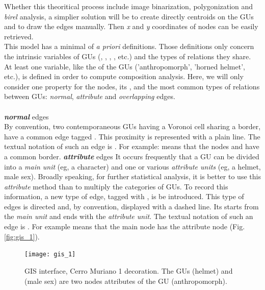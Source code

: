 \documentclass[article]{jss}\usepackage{knitr}
\begin{document}
Whether this theoritical process include image binarization, polygonization and \emph{birel} analysis, a simplier solution will be to create directly centroids on the GUs and to draw the edges manually. Then \emph{x} and \emph{y} coordinates of nodes can be easily retrieved.\\
This model has a minimal of \emph{a priori} definitions. Those definitions only concern the intrinsic variables of GUs (, , , , etc.) and the types of relations they share. At least one variable, like the  of the GUs ('anthropomorph', 'horned helmet', etc.), is defined in order to compute composition analysis. Here, we will only consider one property for the nodes, its , and the most common types of relations between GUs: \emph{normal}, \emph{attribute} and \emph{overlapping} edges.\\
\\
\textbf{\emph{normal}} edges
\\
By convention, two contemporaneous GUs having a Voronoi cell sharing a border, have a common edge tagged . This proximity is represented with a plain line. The textual notation of such an edge is . For example:  means that the nodes  and  have a common border.  
\smallbreak
\textbf{\emph{attribute}} edges
\smallbreak
It occurs frequently that a GU can be divided into a \emph{main unit} (eg, a character) and one or various \emph{attribute units} (eg, a helmet, male sex). Broadly speaking, for further statistical analysis, it is better to use this \emph{attribute} method than to multiply the categories of GUs. To record this information, a new type of edge, tagged with , is be introduced. This type of edges is directed and, by convention, displayed with a dashed line. Its starts from the \emph{main unit} and ends with the \emph{attribute unit}. The textual notation of such an edge is . For example  means that the main node  has the attribute node  (Fig. \ref{fig:gis_1}).

\begin{figure}[H] 
\centering
\texttt{[image: gis\_1]}
\caption{\label{fig:gis1} GIS interface, Cerro Muriano 1 decoration. The GUs  (helmet) and  (male sex) are two nodes attributes of the GU  (anthropomorph).}
\end{figure}
\end{document}
